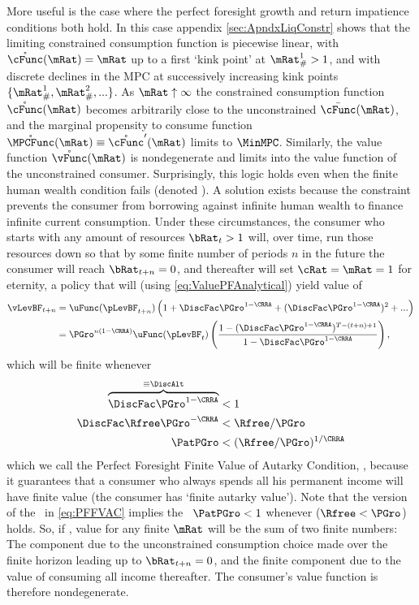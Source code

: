 \documentclass[./BufferStockTheory.tex]{subfiles}
\begin{document}
More useful is the case where the perfect foresight growth and return impatience conditions both hold.  In this case appendix \ref{sec:ApndxLiqConstr} shows that the limiting constrained consumption function is piecewise linear, with $\mathring{\cFunc}(\mRat)=\mRat$ up to a first `kink point' at $\mRat_{\#}^{1}>1$, and with discrete declines in the MPC at successively increasing kink points $\{\mRat_{\#}^{1},\mRat_{\#}^{2},...\}$.  As $\mRat \uparrow \infty$ the constrained consumption function $\mathring{\cFunc}(\mRat)$ becomes arbitrarily close to the unconstrained $\bar{\cFunc}(\mRat)$, and the marginal propensity to consume function $\mathring{\MPCFunc}(\mRat) \equiv \mathring{\cFunc}^{\prime}(\mRat)$ limits to $\MinMPC$.  Similarly, the value function $\mathring{\vFunc}(\mRat)$ is nondegenerate and limits into the value function of the unconstrained consumer.  Surprisingly, this logic holds even when the finite human wealth condition fails (denoted \cncl{\FHWC}).  A solution exists because the constraint prevents the consumer from borrowing against infinite human wealth to finance infinite current consumption.  Under these circumstances, the consumer who starts with any amount of resources $\bRat_{t} > 1$ will, over time, run those resources down so that by some finite number of periods $n$ in the future the consumer will reach $\bRat_{t+n} = 0$, and thereafter will set $\cRat = \mRat = 1$ for eternity, a policy that will (using \eqref{eq:ValuePFAnalytical}) yield value of \hypertarget{PFFVAC}{}
\begin{align}
  \vLevBF_{t+n}  & = \uFunc(\pLevBF_{t+n})\left(1+\DiscFac
    \PGro^{1-\CRRA}+(\DiscFac \PGro^{1-\CRRA})^{2}+...\right) \notag
  \\  & = \PGro^{n(1-\CRRA)} \uFunc(\pLevBF_{t})\left(\frac{1-(\DiscFac
      \PGro^{1-\CRRA})^{T-(t+n)+1}}{1-\DiscFac \PGro^{1-\CRRA}}\right),
  \notag
\end{align}
which will be finite whenever 
\begin{align}
   \overbrace{\DiscFac \PGro^{1-\CRRA} }^{\equiv \DiscAlt}  & < 1 \label{eq:PFFVAC}
\\ \DiscFac \Rfree \PGro^{-\CRRA}  & < \Rfree/\PGro \nonumber
\\ \PatPGro  & < (\Rfree/\PGro)^{1/\CRRA} \nonumber
\end{align}
which we call the Perfect Foresight Finite Value of Autarky Condition, \PFFVAC, because it guarantees that a consumer who always spends all his permanent income will have finite value (the consumer has `finite autarky value').  Note that the version of the \PFFVAC~in \eqref{eq:PFFVAC} implies the \PFGIC~$\PatPGro < 1$ whenever \cncl{\FHWC} ($\Rfree < \PGro$) holds.  So, if \cncl{\FHWC}, value for any finite $\mRat$ will be the sum of two finite numbers: The component due to the unconstrained consumption choice made over the finite horizon leading up to $\bRat_{t+n} = 0$, and the finite component due to the value of consuming all income thereafter.  The consumer's value function is therefore nondegenerate.
\end{document}
